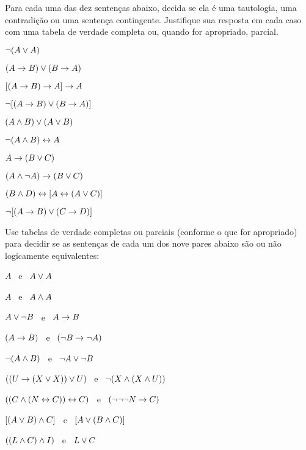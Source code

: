 \noindent\problempart
\label{pr.TT.TTorC4}
Para cada uma das dez sentenças abaixo, decida se ela é uma tautologia, uma contradição ou uma sentença contingente.
Justifique sua resposta em cada caso com uma tabela de verdade completa ou, quando for apropriado, parcial.
\begin{earg}
\item  $\neg (A \vee A)$\vspace{.5ex}							%
\item $(A \rightarrow B) \vee (B \rightarrow A)$\vspace{.5ex}					%
\item $[(A \rightarrow B) \rightarrow A] \rightarrow A$\vspace{.5ex}					%
\item $\neg[( A \rightarrow B) \vee (B \rightarrow A)]$\vspace{.5ex}			%
\item $(A \wedge B) \vee (A \vee B)$\vspace{.5ex} 				%
\item $\neg(A\wedge B) \leftrightarrow A$\vspace{.5ex} 					%
\item $A\rightarrow(B\vee C)$\vspace{.5ex} 							%
\item $(A \wedge\neg A) \rightarrow (B \vee C)$\vspace{.5ex} 			%
\item $(B\wedge D) \leftrightarrow [A \leftrightarrow(A \vee C)]$\vspace{.5ex}			%
\item $\neg[(A \rightarrow B) \vee (C \rightarrow D)]$\vspace{.5ex} 			%
\end{earg}


\noindent\problempart
Use tabelas de verdade completas ou parciais (conforme o que for apropriado) para decidir se as sentenças de cada um dos nove pares abaixo são ou não logicamente equivalentes:
\begin{earg}
\item $A$ \ e \ $A \vee A$
\item $A$ \ e \ $A \wedge A$
\item $A \vee \neg B$ \ e \ $A\rightarrow B$
\item $(A \rightarrow B)$ \ e \ $(\neg B \rightarrow \neg A)$
\item $\neg(A \wedge B)$ \ e \ $\neg A \vee \neg B$
\item $ ((U \rightarrow (X \vee X)) \vee U)$ \ e \ $\neg (X \wedge (X \wedge U))$
\item $ ((C \wedge (N \leftrightarrow C)) \leftrightarrow C)$ \ e \ $(\neg \neg \neg N \rightarrow C)$
\item $[(A \vee B) \wedge C]$ \ e \ $[A \vee (B \wedge C)]$
\item $((L \wedge C) \wedge I)$ \ e \ $L \vee C$
\end{earg}


